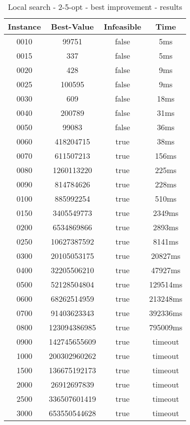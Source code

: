 \begin{table}
\centering
	\begin{tabular}{|| c | c | c | c ||} 
		\hline
		Instance & Best-Value & Infeasible & Time \\
		\hline\hline
0010 & 99751 & false & 5ms \\
0015 & 337 & false & 5ms \\
0020 & 428 & false & 9ms \\
0025 & 100595 & false & 9ms \\
0030 & 609 & false & 18ms \\
0040 & 200789 & false & 31ms \\
0050 & 99083 & false & 36ms \\
0060 & 418204715 & true & 38ms \\
0070 & 611507213 & true & 156ms \\
0080 & 1260113220 & true & 225ms \\
0090 & 814784626 & true & 228ms \\
0100 & 885992254 & true & 510ms \\
0150 & 3405549773 & true & 2349ms \\
0200 & 6534869866 & true & 2893ms \\
0250 & 10627387592 & true & 8141ms \\
0300 & 20105053175 & true & 20827ms \\
0400 & 32205506210 & true & 47927ms \\
0500 & 52128504804 & true & 129514ms \\
0600 & 68262514959 & true & 213248ms \\
0700 & 91403623343 & true & 392336ms \\
0800 & 123094386985 & true & 795009ms \\
0900 & 142745655609 & true & timeout \\
1000 & 200302960262 & true & timeout \\
1500 & 136675192173 & true & timeout \\
2000 & 26912697839 & true & timeout \\
2500 & 336507601419 & true & timeout \\
3000 & 653550544628 & true & timeout \\
		\hline
	\end{tabular}
\caption{Local search - 2-5-opt - best improvement - results}
\end{table}

